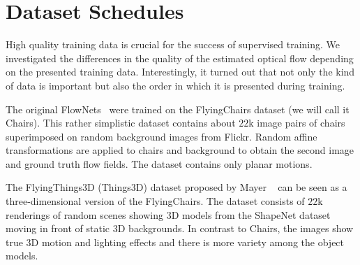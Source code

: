\documentclass[10pt,twocolumn,letterpaper]{article}%
\newcommand{\chairs}{\mbox{Chairs}\xspace}
\newcommand{\things}{\mbox{Things3D}\xspace}
\begin{document}

\section{Dataset Schedules \label{sec:dataset-schedules}}

High quality training data is crucial for the success of supervised training.
We investigated the differences in the quality of the estimated optical flow depending on the presented training data. Interestingly, it turned out that not only the kind of data is important but also the order in which it is presented during training. 

The original FlowNets~\cite{DFIB15} were trained on the FlyingChairs dataset (we will call it \chairs). This rather simplistic dataset contains about $22$k image pairs of chairs superimposed on random background images from Flickr. Random affine transformations are applied to chairs and background to obtain the second image and ground truth flow fields. The dataset contains only planar motions. 

The FlyingThings3D (\things) dataset proposed by Mayer \etal~\cite{MIFDB16} can be seen as a three-dimensional version of the FlyingChairs.
The dataset consists of $22$k renderings of random scenes showing 3D models from the ShapeNet dataset~\cite{shapenet} moving in front of static 3D backgrounds. In contrast to \chairs, the images show true 3D motion and lighting effects and there is more variety among the object models. 

\end{document}
